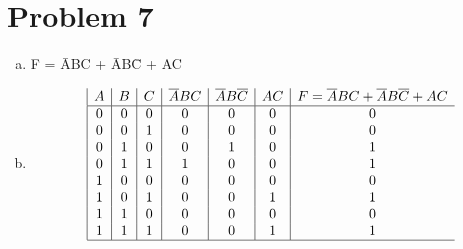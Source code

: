 \documentclass[11pt]{article}
\begin{document}
\section*{Problem 7}
	\begin{enumerate}[(a)]
		\item F = \={A}BC + \={A}B\={C} + AC
		\item 
		\begin{displaymath}
		\begin{array}{|c|c|c|c|c|c|c}
		A
		& B
		& C 
		& \overline{A}BC
		& \overline{A}B\overline{C}
		& AC
		& F = \overline{A}BC + \overline{A}B\overline{C} + AC \\
		\hline
		0 & 0 & 0 & 0 & 0 & 0 & 0 \\
		0 & 0 & 1 & 0 & 0 & 0 & 0 \\
		0 & 1 & 0 & 0 & 1 & 0 & 1 \\
		0 & 1 & 1 & 1 & 0 & 0 & 1 \\
		1 & 0 & 0 & 0 & 0 & 0 & 0 \\
		1 & 0 & 1 & 0 & 0 & 1 & 1 \\
		1 & 1 & 0 & 0 & 0 & 0 & 0 \\
		1 & 1 & 1 & 0 & 0 & 1 & 1 \\
		\hline
		
		
		\end{array}
		\end{displaymath}
		
	\end{enumerate}
\end{document}
